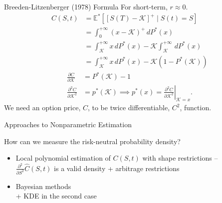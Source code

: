 \documentclass[10pt,aspectratio=43]{beamer}
\begin{document}
\begin{frame}{Breeden-Litzenberger (1978) Formula}
\nocite{breedenPricesStateContingentClaims1978}
For short-term, $r\approx 0$.
    \begin{align*}
        C(S,t)&=\mathbb{E}^*\left[[S(T)-\mathcal{K}]^+\mid S(t)=S\right]\\ 
        &=\int_0^{+\infty}(x-\mathcal{K})^+\,dP^*(x)\\ &=\int_{\mathcal{K}}^{+\infty}x\,dP^*(x)-\mathcal{K}\int_\mathcal{K}^{+\infty}\,dP^*(x)\\ 
        &=\int_{\mathcal{K}}^{+\infty}x\,dP^*(x)-\mathcal{K}(1-P^*(\mathcal{K}))
    \end{align*}
    \begin{align*}
        \frac{\partial C}{\partial \mathcal{K}}&=P^*(\mathcal{K})-1\\ 
        \frac{\partial^2 C}{\partial \mathcal{K}^2}&=p^*(\mathcal{K})\implies p^*(x)=\left.\frac{\partial^2 C}{\partial\mathcal{K}^2}\right|_{\mathcal{K}=x}.
    \end{align*}
   We need an option price, $C$, to be twice differentiable, $C^2$, function. 
\end{frame}


\begin{frame}{Approaches to Nonparametric Estimation}

    How can we measure the risk-neutral probability density?

    \begin{itemize}  \setlength\itemsep{1em}
        \item Local polynomial estimation of $C(S,t)$ with shape restrictions --\\ $\frac{\partial^2}{\partial S^2}\hat C(S,t)$ is a valid density + \cite{mertonTheoryRationalOption1973} arbitrage restrictions \\ {\scriptsize\parencite{ait-sahaliaNonparametricOptionPricing2003,leeEstimationRiskneutralMeasures2014}}
        \item Bayesian methods \\{\scriptsize\parencite{fisherSimplexRegression2016, hardleStatePriceDensities2015,tabogaOptionimpliedProbabilityDistributions2016} + KDE in the second case}
    \end{itemize}
\end{frame}
\end{document}
